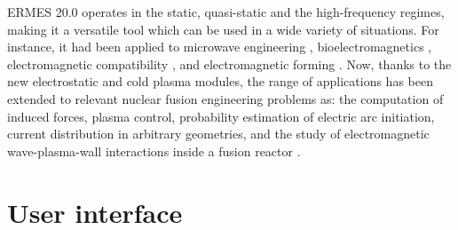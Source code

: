 ERMES 20.0 operates in the static, quasi-static and the high-frequency regimes, making it a versatile tool which can be used in a wide variety of situations. For instance, it had been applied to microwave engineering \cite{EMPaper-Me}, bioelectromagnetics \cite{NextGEM, ERMES-SAR-PIER, RFID-PIER}, electromagnetic compatibility \cite{Zt-IE3, Zt-CPC}, and electromagnetic forming \cite{LorentzForceFD, EMF-IJSS}. Now, thanks to the new electrostatic and cold plasma modules, the range of applications has been extended to relevant nuclear fusion engineering problems as: the computation of induced forces, plasma control, probability estimation of electric arc initiation, current distribution in arbitrary geometries, and the study of electromagnetic wave-plasma-wall interactions inside a fusion reactor \cite{NAFEMS-CEM, FWRF-AIP, APS-DPP-2023, APS-DPP-2022, STEP-Control}. 

\section{User interface}\label{ssUserInterface}

